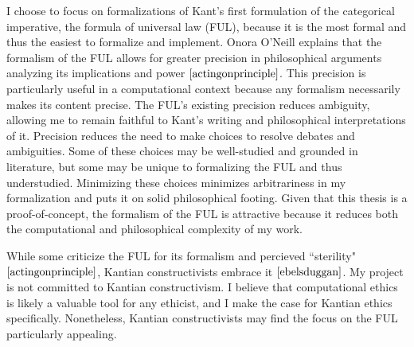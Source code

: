 \begin{isabellebody}
\begin{isamarkuptext}
I choose to focus on formalizations of Kant's first formulation of the categorical imperative,
the formula of universal law (FUL), because it is the most formal and thus the easiest to formalize and implement. 
Onora O'Neill explains that the formalism of the FUL allows 
for greater precision in philosophical arguments analyzing its implications and power $\cite[33]{actingonprinciple}$. This precision 
is particularly useful in a computational context because any formalism necessarily makes its content 
precise. The FUL's existing precision reduces ambiguity, allowing me to remain faithful to Kant's writing and 
philosophical interpretations of it. Precision reduces the need to make choices to resolve debates 
and ambiguities. Some of these choices may be well-studied and grounded in literature, 
but some may be unique to formalizing the FUL and thus understudied. Minimizing these choices minimizes 
arbitrariness in my formalization and puts it on solid philosophical footing. Given that this thesis is a proof-of-concept, 
the formalism of the FUL is attractive because it reduces both the computational and philosophical complexity of my work. 

While some criticize the FUL for its formalism and percieved ``sterility" $\cite[33]{actingonprinciple}$, 
Kantian constructivists embrace it $\cite[173]{ebelsduggan}$. My project is not committed to Kantian constructivism. 
I believe that computational ethics is likely a valuable tool for any ethicist, and I make the case 
for Kantian ethics specifically. Nonetheless, Kantian constructivists may find the focus on 
the FUL particularly appealing. 


\end{isamarkuptext}
\end{isabellebody}
